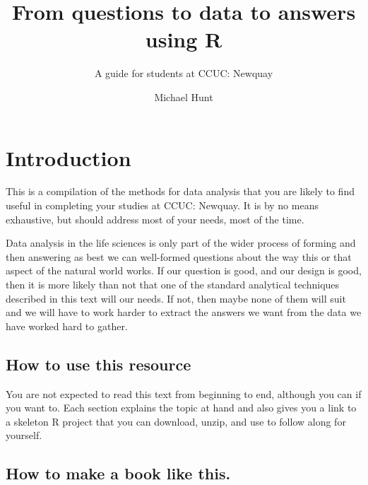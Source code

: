 \documentclass[
  letterpaper,
  DIV=11,
  numbers=noendperiod]{scrreprt}
\title{From questions to data to answers using R}
\subtitle{A guide for students at CCUC: Newquay}
\author{Michael Hunt}
\date{}
\renewcommand*\contentsname{Table of contents}
\newcommand\contentsname{Table of contents}
\begin{document}
\maketitle

\renewcommand*\contentsname{Table of contents}
{
\hypersetup{linkcolor=}
\setcounter{tocdepth}{2}
\tableofcontents
}


\chapter*{Introduction}\label{introduction}


This is a compilation of the methods for data analysis that you are
likely to find useful in completing your studies at CCUC: Newquay. It is
by no means exhaustive, but should address most of your needs, most of
the time.

Data analysis in the life sciences is only part of the wider process of
forming and then answering as best we can well-formed questions about
the way this or that aspect of the natural world works. If our question
is good, and our design is good, then it is more likely than not that
one of the standard analytical techniques described in this text will
our needs. If not, then maybe none of them will suit and we will have to
work harder to extract the answers we want from the data we have worked
hard to gather.

\section*{How to use this resource}\label{how-to-use-this-resource}


You are not expected to read this text from beginning to end, although
you can if you want to. Each section explains the topic at hand and also
gives you a link to a skeleton R project that you can download, unzip,
and use to follow along for yourself.

\section*{How to make a book like
this.}\label{how-to-make-a-book-like-this.}
\end{document}
